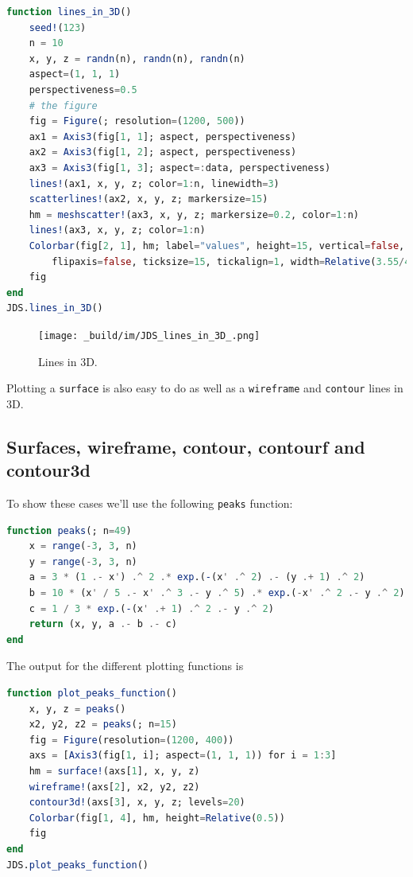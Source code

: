 \documentclass[
  notoc %
]{tufte-book}
\newcommand{\passthrough}[1]{#1}
\begin{document}
\begin{lstlisting}[language=Julia]
function lines_in_3D()
    seed!(123)
    n = 10
    x, y, z = randn(n), randn(n), randn(n)
    aspect=(1, 1, 1)
    perspectiveness=0.5
    # the figure
    fig = Figure(; resolution=(1200, 500))
    ax1 = Axis3(fig[1, 1]; aspect, perspectiveness)
    ax2 = Axis3(fig[1, 2]; aspect, perspectiveness)
    ax3 = Axis3(fig[1, 3]; aspect=:data, perspectiveness)
    lines!(ax1, x, y, z; color=1:n, linewidth=3)
    scatterlines!(ax2, x, y, z; markersize=15)
    hm = meshscatter!(ax3, x, y, z; markersize=0.2, color=1:n)
    lines!(ax3, x, y, z; color=1:n)
    Colorbar(fig[2, 1], hm; label="values", height=15, vertical=false,
        flipaxis=false, ticksize=15, tickalign=1, width=Relative(3.55/4))
    fig
end
JDS.lines_in_3D()
\end{lstlisting}

\begin{figure}
\hypertarget{fig:lines_in_3D}{%
\centering
\texttt{[image: \_build/im/JDS\_lines\_in\_3D\_.png]}
\caption{Lines in 3D.}\label{fig:lines_in_3D}
}
\end{figure}

Plotting a \passthrough{\lstinline!surface!} is also easy to do as well
as a \passthrough{\lstinline!wireframe!} and
\passthrough{\lstinline!contour!} lines in 3D.

\hypertarget{surfaces-wireframe-contour-contourf-and-contour3d}{%
\subsection{Surfaces, wireframe, contour, contourf and
contour3d}\label{surfaces-wireframe-contour-contourf-and-contour3d}}

To show these cases we'll use the following
\passthrough{\lstinline!peaks!} function:

\begin{lstlisting}[language=Julia]
function peaks(; n=49)
    x = range(-3, 3, n)
    y = range(-3, 3, n)
    a = 3 * (1 .- x') .^ 2 .* exp.(-(x' .^ 2) .- (y .+ 1) .^ 2)
    b = 10 * (x' / 5 .- x' .^ 3 .- y .^ 5) .* exp.(-x' .^ 2 .- y .^ 2)
    c = 1 / 3 * exp.(-(x' .+ 1) .^ 2 .- y .^ 2)
    return (x, y, a .- b .- c)
end
\end{lstlisting}

The output for the different plotting functions is

\begin{lstlisting}[language=Julia]
function plot_peaks_function()
    x, y, z = peaks()
    x2, y2, z2 = peaks(; n=15)
    fig = Figure(resolution=(1200, 400))
    axs = [Axis3(fig[1, i]; aspect=(1, 1, 1)) for i = 1:3]
    hm = surface!(axs[1], x, y, z)
    wireframe!(axs[2], x2, y2, z2)
    contour3d!(axs[3], x, y, z; levels=20)
    Colorbar(fig[1, 4], hm, height=Relative(0.5))
    fig
end
JDS.plot_peaks_function()
\end{lstlisting}
\end{document}
